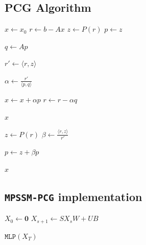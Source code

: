 \subsection{PCG Algorithm}
\begin{algorithm}[H]
    \caption{Preconditioned Conjugate Gradient}
    \label{alg:pcg}
    \begin{algorithmic}[1]

        \State $x \gets x_0$
        \State $r \gets b - Ax$
        \State $z \gets P(r)$
        \State $p \gets z$

        \State $q \gets A p$

        \State $r' \gets \langle r,z \rangle$

        \State $\alpha \gets \frac{r'}{\langle p,q\rangle}$

        \State $x \gets x + \alpha p$
        \State $r \gets r - \alpha q$

        \State \Return $x$
        \EndIf

        \State $z \gets P(r)$
        \State $\beta \gets \frac{\langle r, z\rangle}{r'}$

        \State $p \gets z + \beta p$

        \EndFor

        \State \Return $x$
    \end{algorithmic}
\end{algorithm}

\subsection{\texttt{MPSSM-PCG} implementation}
%
%
%
%

\begin{algorithm}[H]
    \caption{MPSSM Block}
    \label{alg:mpssm_block}
    \begin{algorithmic}[1]

        \State $X_0 \gets \mathbf{0}$
        \State $X_{s + 1} \gets SX_{s}W + UB$
        \EndFor

        \State \Return $\texttt{MLP}(X_T)$
    \end{algorithmic}
\end{algorithm}

